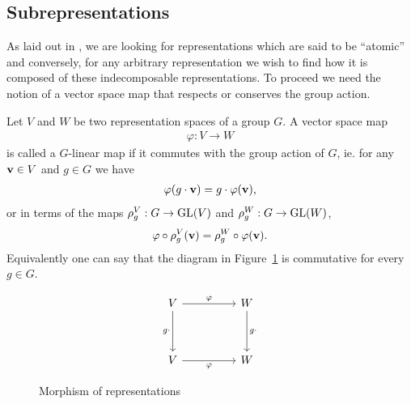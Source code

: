 \subsection{Subrepresentations}

As laid out in \cite{FultonHarris}, we are looking for representations which are said to be ``atomic'' and conversely, for any arbitrary representation we wish to find how it is composed of these indecomposable representations. To proceed we need the notion of a vector space map that respects or conserves the group action.	


\begin{definition}\cite{FultonHarris}
	Let $V$ and $W$ be two representation spaces of a group $G$. A vector space map 
	\begin{align*}
		\varphi: V \rightarrow W
	\end{align*} 
	is called a $G$-linear map if it commutes with the group action of $G$, ie. for any $\mathbf{v} \in V$ and $g \in G$ we have
	\begin{align*}
		\varphi( g \cdot \mathbf{v} ) = g \cdot \varphi (\mathbf{v}),
	\end{align*}
	or in terms of the maps $\rho_g^V: G \rightarrow \text{GL}(V)$ and $\rho_g^W: G \rightarrow \text{GL}(W)$,
	\begin{align*}
		\varphi \circ \rho^V_g (\mathbf{v}) = \rho^W_g \circ \varphi (\mathbf{v}).
	\end{align*}
	Equivalently one can say that the diagram in Figure~\ref*{fig:commapmorp} is commutative for every $g \in G$.
	\begin{figure}[hbt!]
		\centering
		\[\begin{tikzcd}
			V && W \\
			\\
			V && W
			\arrow["\varphi", from=1-1, to=1-3]
			\arrow["g\cdot"', from=1-1, to=3-1]
			\arrow["g\cdot", from=1-3, to=3-3]
			\arrow["\varphi"', from=3-1, to=3-3]
		\end{tikzcd}\]
		\caption{Morphism of representations}
		\label{fig:commapmorp}
	\end{figure}
\end{definition}

